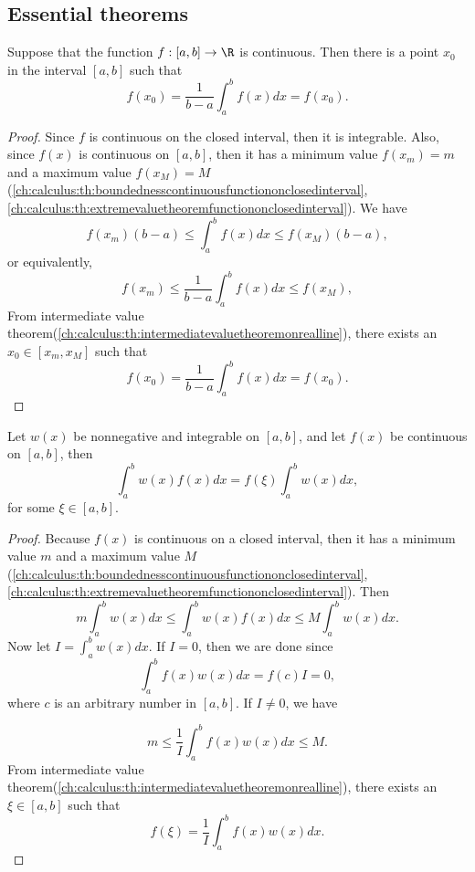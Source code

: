 \begin{refsection}
\subsection{Essential theorems}
\begin{theorem}\cite[166]{fitzpatrick2006advanced}\label{ch:calculus:th:meanValueTheoremForIntegral}
Suppose that the function $f:[a,b]\to \R$ is continuous. Then there is a point $x_0$ in the interval $[a,b]$ such that 
$$f(x_0) = \frac{1}{b-a}\int_a^b f(x) dx = f(x_0).$$	
\end{theorem}
\begin{proof}
Since $f$ is continuous on the closed interval, then it is integrable. Also, since $f(x)$ is continuous on $[a,b]$, then it has a minimum value $f(x_m) = m$ and a maximum value $f(x_M) = M$(\autoref{ch:calculus:th:boundednesscontinuousfunctiononclosedinterval},\autoref{ch:calculus:th:extremevaluetheoremfunctiononclosedinterval}). We have
$$f(x_m)(b-a) \leq \int_a^b f(x) dx  \leq f(x_M)(b-a),$$
or equivalently,
$$f(x_m) \leq \frac{1}{b-a}\int_a^b f(x) dx  \leq f(x_M),$$
From intermediate value theorem(\autoref{ch:calculus:th:intermediatevaluetheoremonrealline}), there exists an $x_0 \in[x_m,x_M]$ such that 
$$f(x_0) = \frac{1}{b-a}\int_a^b f(x) dx = f(x_0).$$




\end{proof}



\begin{lemma}
Let $w(x)$ be nonnegative and integrable on $[a,b]$, and let $f(x)$ be continuous on $[a,b]$, then 
$$\int_a^b w(x)f(x) dx = f(\xi)\int_a^b w(x)dx,$$
for some $\xi \in [a,b]$. 
\end{lemma}
\begin{proof}
Because $f(x)$ is continuous on a closed interval, then it has a minimum value $m$ and a maximum value $M$(\autoref{ch:calculus:th:boundednesscontinuousfunctiononclosedinterval},\autoref{ch:calculus:th:extremevaluetheoremfunctiononclosedinterval}). Then
$$m\int_a^b w(x)dx \leq \int_a^b w(x)f(x) dx \leq M \int_a^b w(x)dx. $$
Now let
$I = \int_a^b w(x)dx.$ If $I = 0$, then we are done since
$$\int_a^b f(x)w(x) dx = f(c)I = 0,$$
where $c$ is an arbitrary number in $[a,b]$.	
If $I \neq 0$, we have 

$$m \leq \frac{1}{I}\int_a^b f(x)w(x)dx \leq M.$$
From intermediate value theorem(\autoref{ch:calculus:th:intermediatevaluetheoremonrealline}), there exists an $\xi \in[a,b]$ such that 
$$f(\xi) = \frac{1}{I}\int_a^b f(x)w(x)dx.$$
\end{proof}


\end{refsection}
